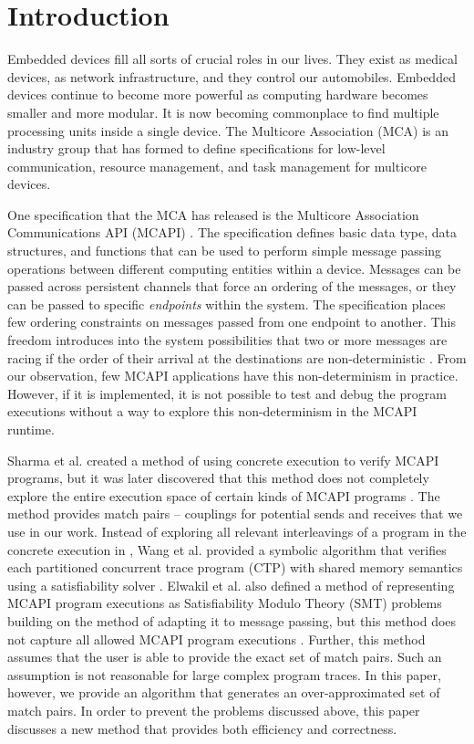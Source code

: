 \section{Introduction}
Embedded devices fill all sorts of crucial roles in our lives. They exist as
medical devices, as network infrastructure, and they control our automobiles.
Embedded devices continue to become more powerful as computing hardware becomes
smaller and more modular. It is now becoming commonplace to find multiple
processing units inside a single device. The Multicore Association (MCA) \cite{mca} is an
industry group that has formed to define specifications for low-level
communication, resource management, and task management for
multicore devices.

One specification that the MCA has released is the Multicore Association
Communications API (MCAPI) \cite{mcapi}. The specification defines basic data type, data
structures, and functions that can be used to perform simple message passing
operations between different computing entities within a device. Messages can be
passed across persistent channels that force an ordering of the messages, or
they can be passed to specific \emph{endpoints} within the system. The specification places few ordering constraints on messages passed from one
endpoint to another. This freedom introduces into the system possibilities that two or more messages are racing if the order of their arrival at the destinations are non-deterministic \cite{netzer:spdt96}. From our observation, few MCAPI applications have this non-determinism in practice. However, if it is implemented, it is not possible to test and debug the program executions without a way to explore this non-determinism in the MCAPI runtime.

Sharma et al. created a method of using concrete execution to verify MCAPI
programs, but it was later discovered that this method does not completely
explore the entire execution space of certain kinds of MCAPI programs \cite{sharma:fmcad09}. The method provides match pairs -- couplings for potential sends and receives that we use in our work. Instead of exploring all relevant interleavings of a program in the concrete execution in \cite{sharma:fmcad09}, Wang et al. provided a symbolic algorithm that verifies each partitioned concurrent trace program (CTP) with shared memory semantics using a satisfiability solver \cite{wang:fse09}. Elwakil et al. also defined a method of representing MCAPI program executions as Satisfiability Modulo Theory (SMT) problems building on the method of \cite{wang:fse09} adapting it to message passing, but this method does not capture all allowed MCAPI program executions \cite{elwakil:padtad10}. Further, this method assumes that the user is able to provide the exact set of match pairs. Such an assumption is not reasonable for large complex program traces. In this paper, however, we provide an algorithm that generates an over-approximated set of match pairs. In order to prevent the problems discussed above, this paper discusses a new method that provides both efficiency and correctness.


